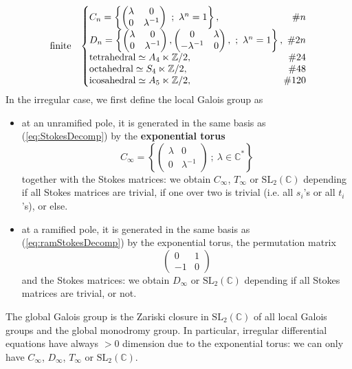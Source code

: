 \documentclass[12]{amsart}
\newcommand{\SL}{\mathrm{SL}_2}
\begin{document}
\begin{equation}
\begin{matrix}
\text{finite} & 
\left\{\begin{matrix} C_n=\left\{\begin{pmatrix}\lambda&0\\ 0&\lambda^{-1}\end{pmatrix}\ ;\ \lambda^n=1\right\},\hfill \# n\\
D_n=\left\{\begin{pmatrix}\lambda&0\\ 0&\lambda^{-1}\end{pmatrix},\begin{pmatrix}0&\lambda\\ -\lambda^{-1}&0\end{pmatrix},\ ;\ \lambda^n=1\right\},\ \# 2n\\
\text{tetrahedral}\simeq A_4\ltimes\mathbb Z/2,\hfill \#24\\
\text{octahedral}\simeq S_4\ltimes\mathbb Z/2,\hfill \#48\\
\text{icosahedral}\simeq A_5\ltimes\mathbb Z/2,\hfill\#120
\end{matrix}\right.
\end{matrix}
\end{equation}
In the irregular case, we first define the local Galois group as
\begin{itemize}
\item at an unramified pole, it is generated in the same basis as (\ref{eq:StokesDecomp}) by the {\bf exponential torus}
$$C_\infty=\left\{\begin{pmatrix}\lambda&0\\ 0&\lambda^{-1}\end{pmatrix}\ ;\ \lambda\in\mathbb C^*\right\}$$
together with the Stokes matrices: we obtain $C_\infty$, $T_\infty$ or $\SL(\mathbb C)$
depending if all Stokes matrices are trivial, if one over two is trivial (i.e. all $s_i$'s or all $t_i$'s), or else.

\item at a ramified pole, it is generated in the same basis as (\ref{eq:ramStokesDecomp}) by the exponential torus, the permutation matrix
$$\begin{pmatrix}0&1\\ -1&0\end{pmatrix}$$
and the Stokes matrices: we obtain $D_\infty$ or $\SL(\mathbb C)$
depending if all Stokes matrices are trivial, or not. \end{itemize}
The global Galois group is the Zariski closure in $\SL(\mathbb C)$ of all local Galois groups and the global monodromy group. In particular, irregular differential equations have always $>0$ dimension due to the exponential torus:
we can only have $C_\infty$, $D_\infty$, $T_\infty$ or $\SL(\mathbb C)$.
\end{document}
